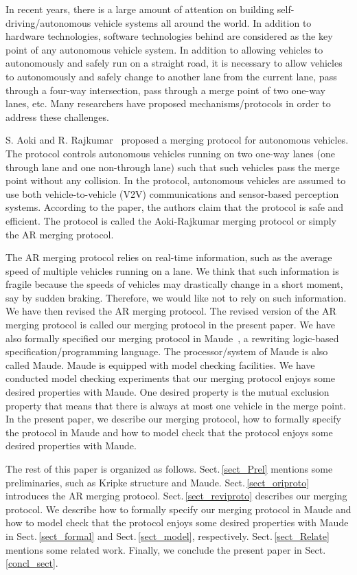 \documentclass[10pt, conference, compsocconf]{IEEEtran}
\begin{document}
In recent years, there is a large amount of attention on building
self-driving/autonomous vehicle systems all around the world.  In
addition to hardware technologies, software technologies behind are
considered as the key point of any autonomous vehicle system.  In
addition to allowing vehicles to autonomously and safely run on a
straight road, it is necessary to allow vehicles to autonomously and
safely change to another lane from the current lane, pass through a
four-way intersection, pass through a merge point of two one-way
lanes, etc. Many researchers have proposed mechanisms/protocols in
order to address these challenges.

S. Aoki and R. Rajkumar~\cite{10.1145/3055004.3055028} proposed a
merging protocol for autonomous vehicles. The protocol controls
autonomous vehicles running on two one-way lanes (one through lane and
one non-through lane) such that such vehicles pass the merge point
without any collision. In the protocol, autonomous vehicles are
assumed to use both vehicle-to-vehicle (V2V) communications and
sensor-based perception systems.  According to the paper, the authors
claim that the protocol is safe and efficient. The protocol is called
the Aoki-Rajkumar merging protocol or simply the AR merging protocol.

The AR merging protocol relies on real-time information, such as the
average speed of multiple vehicles running on a lane. We think that
such information is fragile because the speeds of vehicles may
drastically change in a short moment, say by sudden
braking. Therefore, we would like not to rely on such information. We
have then revised the AR merging protocol. The revised version of the
AR merging protocol is called our merging protocol in the present
paper. We have also formally specified our merging protocol in
Maude~\cite{Clavel2007LNCS}, a rewriting logic-based
specification/programming language. The processor/system of Maude is
also called Maude. Maude is equipped with model checking
facilities. We have conducted model checking experiments that our
merging protocol enjoys some desired properties with Maude. One
desired property is the mutual exclusion property that means that
there is always at most one vehicle in the merge point.  In the
present paper, we describe our merging protocol, how to formally
specify the protocol in Maude and how to model check that the protocol
enjoys some desired properties with Maude.

The rest of this paper is organized as follows. Sect.\,\ref{sect_Prel}
mentions some preliminaries, such as Kripke structure and Maude.
Sect.\,\ref{sect_oriproto} introduces the AR merging protocol.
Sect.\,\ref{sect_reviproto} describes our merging protocol.  We
describe how to formally specify our merging protocol in Maude and how
to model check that the protocol enjoys some desired properties with
Maude in Sect.\,\ref{sect_formal} and Sect.\,\ref{sect_model},
respectively.  Sect.\,\ref{sect_Relate} mentions some related work.
Finally, we conclude the present paper in Sect.\,\ref{concl_sect}.
\end{document}

